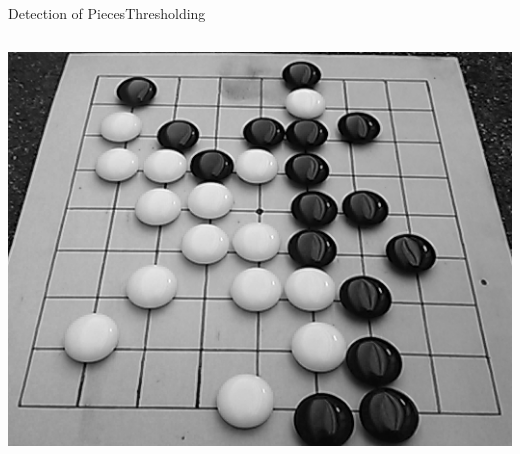 \documentclass[table]{beamer}
\begin{document}
\begin{frame}{Detection of Pieces}{Thresholding}
\begin{columns}
\begin{column}{0.28\textwidth}
{				\includegraphics[width=\columnwidth]{images/pieces_input_aberrat_v.png}%
			}%
\end{column}
\end{columns}
\end{frame}
\end{document}
